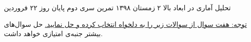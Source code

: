 \documentclass{article}
\begin{document}
\handout
{{تحلیل آماری در ابعاد بالا}}
{۲}
{زمستان ۱۳۹۸}
{تمرین سری دوم}
{پایان روز ۲۲ فروردین}

\vspace{0.5cm}
\underline{
توجه: هفت سوال از سوالات زیر را به دلخواه انتخاب کرده و حل نمایید.}
حل‌ سوال‌های بیشتر جنبه‌ی امتیازی خواهد داشت.












\end{document}
